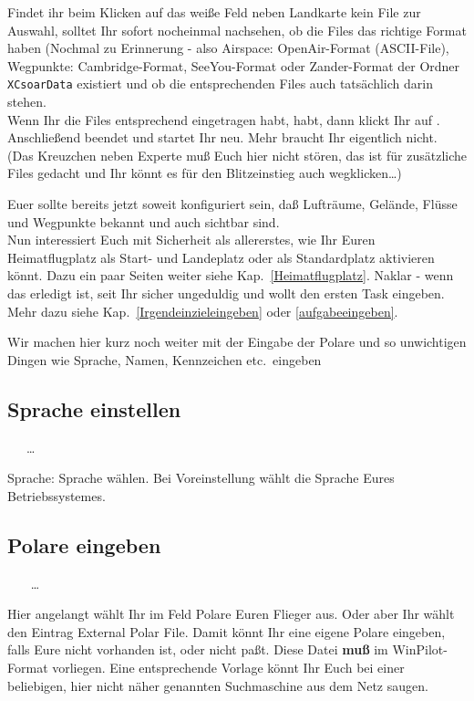  Findet ihr beim Klicken auf das weiße Feld neben \textsf{Landkarte} kein File zur Auswahl, solltet Ihr sofort nocheinmal nachsehen, ob die Files das richtige Format haben (Nochmal zu Erinnerung - also Airspace: OpenAir-Format (ASCII-File), Wegpunkte: Cambridge-Format, SeeYou-Format oder Zander-Format der Ordner \texttt{XCsoar\-Data} existiert und ob die entsprechenden Files auch tatsächlich darin stehen. \\

 Wenn Ihr die Files entsprechend eingetragen habt, habt, dann klickt Ihr auf .
  Anschließend beendet und startet Ihr \xc neu. Mehr braucht Ihr eigentlich nicht. (Das Kreuzchen neben Experte muß Euch hier nicht stören, das ist für zusätzliche Files gedacht und Ihr könnt es für den Blitzeinstieg auch wegklicken\dots )

Euer \xc sollte bereits jetzt soweit konfiguriert sein, daß Lufträume, Gelände, Flüsse und Wegpunkte bekannt und auch sichtbar sind.\\

Nun interessiert Euch mit Sicherheit als allererstes, wie Ihr Euren Heimatflugplatz als Start- und Landeplatz oder als Standardplatz aktivieren könnt. Dazu ein paar Seiten weiter siehe Kap.\ \ref{Heimatflugplatz}. Naklar - wenn das erledigt ist, seit Ihr sicher ungeduldig und wollt den ersten Task eingeben.
Mehr dazu siehe Kap.\ \ref{Irgendeinzieleingeben} oder \ref{aufgabeeingeben}.

Wir machen hier kurz noch weiter mit der Eingabe der Polare und so unwichtigen Dingen wie Sprache, Namen, Kennzeichen etc.\  eingeben

\subsection{Sprache einstellen}\label{Spracheeingeben}
\begin{center}
 \blink~\blink~\blink~\far \far\dots{}
 \end{center}

 \textsf{Sprache}: Sprache wählen. Bei \textsf{Voreinstellung} wählt  \xc die  Sprache Eures Betriebssystemes.
 \stop

\subsection{Polare eingeben}
\begin{center}
\blink~\blink~\blink~ \far \far \dots \qquad {}
\end{center}
Hier angelangt wählt Ihr im Feld \textsf{Polare} Euren Flieger aus. Oder aber Ihr wählt den
Eintrag \textsf{External Polar File}. Damit könnt Ihr eine eigene Polare eingeben, falls Eure nicht vorhanden ist, oder nicht paßt. Diese Datei \textbf{muß} im \textsf{WinPilot}-Format vorliegen.
Eine entsprechende Vorlage könnt Ihr Euch bei einer beliebigen, hier nicht näher genannten Suchmaschine aus dem Netz saugen.

